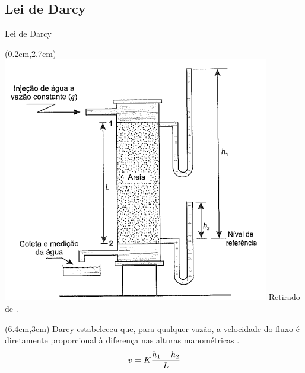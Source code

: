 \documentclass[professionalfont]{beamer}
\begin{document}
\subsection{Lei de Darcy}
\begin{frame}{Lei de Darcy}

\begin{textblock*}{.5\paperwidth}(0.2cm,2.7cm)
    \centering
    \includegraphics[scale=0.4]{./imgs/im1.png}
    \footnotesize Retirado de \cite{Rosa2006}.
\end{textblock*}

\begin{textblock*}{.48\paperwidth}(6.4cm,3cm)
    Darcy estabeleceu que, para qualquer vazão, a velocidade do fluxo é diretamente proporcional à diferença nas alturas manométricas \cite{044441830X}.
    \begin{equation}
        v = K \dfrac{h_{1} - h_{2}}{L}
    \end{equation}
    
    
\end{textblock*}

\end{frame}
\end{document}
